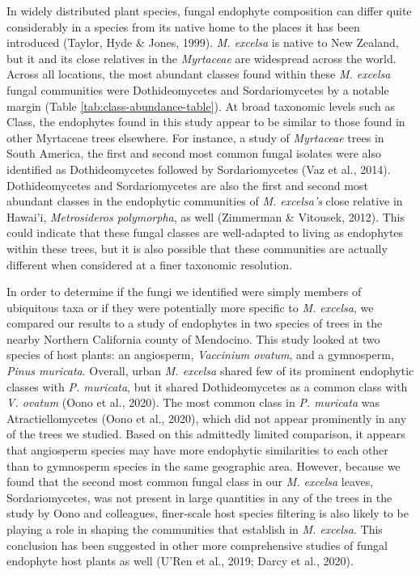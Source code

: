 \documentclass[fleqn,10pt,lineno]{wlpeerj} %
\begin{document}
In widely distributed plant species, fungal endophyte composition can differ quite considerably in a species from its native home to the places it has been introduced (Taylor, Hyde \& Jones, 1999). \emph{M. excelsa} is native to New Zealand, but it and its close relatives in the \emph{Myrtaceae} are widespread across the world. Across all locations, the most abundant classes found within these \emph{M. excelsa} fungal communities were Dothideomycetes and Sordariomycetes by a notable margin (Table \ref{tab:class-abundance-table}). At broad taxonomic levels such as Class, the endophytes found in this study appear to be similar to those found in other Myrtaceae trees elsewhere. For instance, a study of \emph{Myrtaceae} trees in South America, the first and second most common fungal isolates were also identified as Dothideomycetes followed by Sordariomycetes (Vaz et al., 2014). Dothideomycetes and Sordariomycetes are also the first and second most abundant classes in the endophytic communities of \emph{M. excelsa's} close relative in Hawai'i, \emph{Metrosideros polymorpha}, as well (Zimmerman \& Vitousek, 2012). This could indicate that these fungal classes are well-adapted to living as endophytes within these trees, but it is also possible that these communities are actually different when considered at a finer taxonomic resolution.

In order to determine if the fungi we identified were simply members of ubiquitous taxa or if they were potentially more specific to \emph{M. excelsa}, we compared our results to a study of endophytes in two species of trees in the nearby Northern California county of Mendocino. This study looked at two species of host plants: an angiosperm, \emph{Vaccinium ovatum}, and a gymnosperm, \emph{Pinus muricata}. Overall, urban \emph{M. excelsa} shared few of its prominent endophytic classes with \emph{P. muricata}, but it shared Dothideomycetes as a common class with \emph{V. ovatum} (Oono et al., 2020). The most common class in \emph{P. muricata} was Atractiellomycetes (Oono et al., 2020), which did not appear prominently in any of the trees we studied. Based on this admittedly limited comparison, it appears that angiosperm species may have more endophytic similarities to each other than to gymnosperm species in the same geographic area. However, because we found that the second most common fungal class in our \emph{M. excelsa} leaves, Sordariomycetes, was not present in large quantities in any of the trees in the study by Oono and colleagues, finer-scale host species filtering is also likely to be playing a role in shaping the communities that establish in \emph{M. excelsa}. This conclusion has been suggested in other more comprehensive studies of fungal endophyte host plants as well (U'Ren et al., 2019; Darcy et al., 2020).
\end{document}
